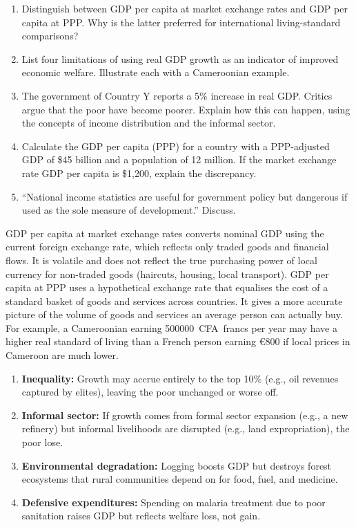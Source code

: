 \documentclass[11pt]{article}
\begin{document}
\begin{exercice}
\begin{enumerate}
\item Distinguish between GDP per capita at market exchange rates and GDP per capita at PPP. Why is the latter preferred for international living-standard comparisons?
\item List four limitations of using real GDP growth as an indicator of improved economic welfare. Illustrate each with a Cameroonian example.
\item The government of Country Y reports a 5\% increase in real GDP. Critics argue that the poor have become poorer. Explain how this can happen, using the concepts of income distribution and the informal sector.
\item Calculate the GDP per capita (PPP) for a country with a PPP-adjusted GDP of \$45 billion and a population of 12 million. If the market exchange rate GDP per capita is \$1,200, explain the discrepancy.
\item ``National income statistics are useful for government policy but dangerous if used as the sole measure of development.'' Discuss.
\end{enumerate}
\end{exercice}

\begin{corrige}[Exercise 1]
GDP per capita at market exchange rates converts nominal GDP using the current foreign exchange rate, which reflects only traded goods and financial flows. It is volatile and does not reflect the true purchasing power of local currency for non-traded goods (haircuts, housing, local transport). GDP per capita at PPP uses a hypothetical exchange rate that equalises the cost of a standard basket of goods and services across countries. It gives a more accurate picture of the volume of goods and services an average person can actually buy. For example, a Cameroonian earning \SI{500000}{CFA francs} per year may have a higher real standard of living than a French person earning €800 if local prices in Cameroon are much lower.
\end{corrige}

\begin{corrige}[Exercise 2]
\begin{enumerate}
\item \textbf{Inequality:} Growth may accrue entirely to the top 10\% (e.g., oil revenues captured by elites), leaving the poor unchanged or worse off.
\item \textbf{Informal sector:} If growth comes from formal sector expansion (e.g., a new refinery) but informal livelihoods are disrupted (e.g., land expropriation), the poor lose.
\item \textbf{Environmental degradation:} Logging boosts GDP but destroys forest ecosystems that rural communities depend on for food, fuel, and medicine.
\item \textbf{Defensive expenditures:} Spending on malaria treatment due to poor sanitation raises GDP but reflects welfare loss, not gain.
\end{enumerate}
\end{corrige}
\end{document}
